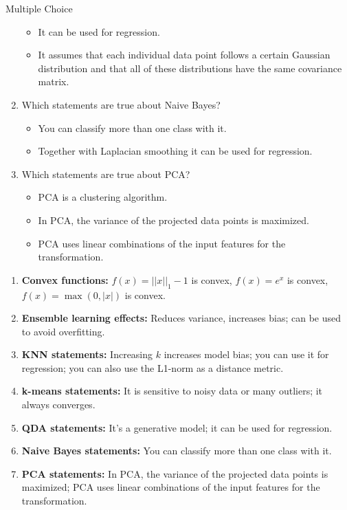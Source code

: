 \documentclass{article}
\begin{document}
\begin{exercise}{Multiple Choice}
\begin{enumerate}
\begin{itemize}
        \item It can be used for regression.
        \item It assumes that each individual data point follows a certain Gaussian distribution and that all of these distributions have the same covariance matrix.
      \end{itemize}
    \item Which statements are true about Naive Bayes?
      \begin{itemize}
        \item You can classify more than one class with it.
        \item Together with Laplacian smoothing it can be used for regression.
      \end{itemize}
    \item Which statements are true about PCA?
      \begin{itemize}
        \item PCA is a clustering algorithm.
        \item In PCA, the variance of the projected data points is maximized.
        \item PCA uses linear combinations of the input features for the transformation.
      \end{itemize}
  \end{enumerate}

  \begin{solution}
    \begin{enumerate}
      \item \textbf{Convex functions:} $f(x) = ||x||_1 - 1$ is convex, $f(x) = e^x$ is convex, $f(x) = \max(0, |x|)$ is convex.
      \item \textbf{Ensemble learning effects:} Reduces variance, increases bias; can be used to avoid overfitting.
      \item \textbf{KNN statements:} Increasing $k$ increases model bias; you can use it for regression; you can also use the L1-norm as a distance metric.
      \item \textbf{k-means statements:} It is sensitive to noisy data or many outliers; it always converges.
      \item \textbf{QDA statements:} It's a generative model; it can be used for regression.
      \item \textbf{Naive Bayes statements:} You can classify more than one class with it.
      \item \textbf{PCA statements:} In PCA, the variance of the projected data points is maximized; PCA uses linear combinations of the input features for the transformation.
    \end{enumerate}
  \end{solution}
\end{exercise}
\end{document}
